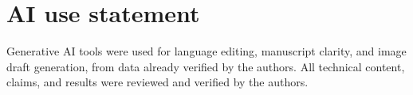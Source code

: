 \section*{AI use statement}
Generative AI tools were used for language editing, manuscript clarity, and image draft generation, from data already verified by the authors. All technical content, claims, and results were reviewed and verified by the authors.
